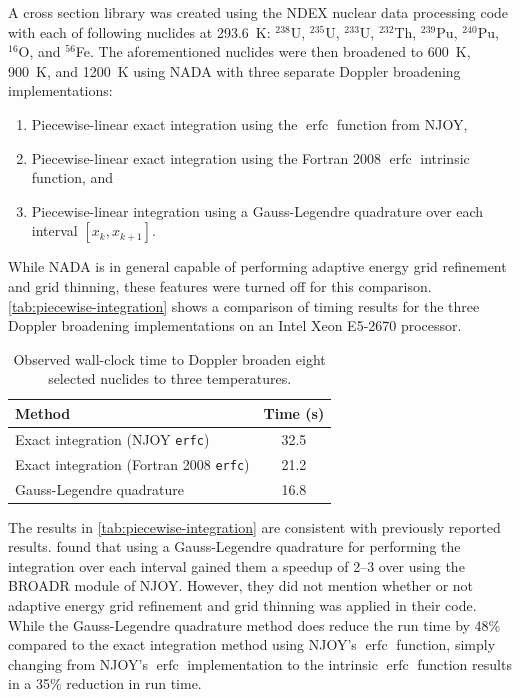 \documentclass[3p,authoryear]{elsarticle}
\DeclareMathOperator\erfc{erfc}
\begin{document}
A cross section library was created using the NDEX nuclear data processing code
with each of following nuclides at \SI{293.6}{\kelvin}: $^{238}$U, $^{235}$U,
$^{233}$U, $^{232}$Th, $^{239}$Pu, $^{240}$Pu, $^{16}$O, and $^{56}$Fe. The
aforementioned nuclides were then broadened to \SI{600}{\kelvin},
\SI{900}{\kelvin}, and \SI{1200}{\kelvin} using NADA with three separate Doppler
broadening implementations:
\begin{enumerate}
\item Piecewise-linear exact integration using the $\erfc$ function from NJOY,
\item Piecewise-linear exact integration using the Fortran 2008 $\erfc$
  intrinsic function, and
\item Piecewise-linear integration using a Gauss-Legendre quadrature over each
  interval $[x_k, x_{k+1}]$.
\end{enumerate}
While NADA is in general capable of performing adaptive energy grid refinement
and grid thinning, these features were turned off for this
comparison. \autoref{tab:piecewise-integration} shows a comparison of timing
results for the three Doppler broadening implementations on an Intel Xeon
E5-2670 processor.
\begin{table}[H]
  \centering
  \caption{Observed wall-clock time to Doppler broaden eight selected nuclides
    to three temperatures.}
  \label{tab:piecewise-integration}
  \begin{tabular}{lc}
    \toprule
    Method & Time (s) \\
    \midrule
    Exact integration (NJOY \texttt{erfc}) & 32.5 \\
    Exact integration (Fortran 2008 \texttt{erfc}) & 21.2 \\
    Gauss-Legendre quadrature & 16.8 \\
    \bottomrule
  \end{tabular}
\end{table}

The results in \autoref{tab:piecewise-integration} are consistent with
previously reported results. \citet{physor-li-2012} found that using a
Gauss-Legendre quadrature for performing the integration over each interval
gained them a speedup of 2--3 over using the BROADR module of NJOY. However,
they did not mention whether or not adaptive energy grid refinement and grid
thinning was applied in their code. While the Gauss-Legendre quadrature method
does reduce the run time by 48\% compared to the exact integration method using
NJOY's $\erfc$ function, simply changing from NJOY's $\erfc$ implementation to
the intrinsic $\erfc$ function results in a 35\% reduction in run time.
\end{document}
